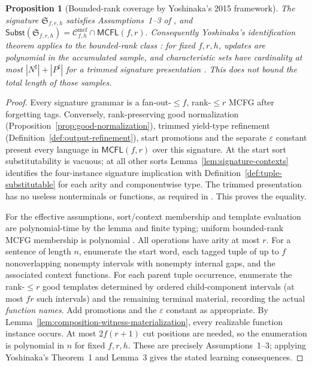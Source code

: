 \documentclass[11pt]{article}
\numberwithin{equation}{section}
\theoremstyle{plain}
\newtheorem{proposition}[theorem]{Proposition}
\theoremstyle{definition}
\theoremstyle{remark}
\newcommand{\Cmcf}[2]{\mathcal{C}^{\mathrm{mcf}}_{#1,#2}}
\newcommand{\eps}{\varepsilon}
\theoremstyle{plain}
\begin{document}
\begin{proposition}[Bounded-rank coverage by Yoshinaka's 2015 framework]
\label{prop:yoshinaka2015-embedding}
The signature $\mathfrak S_{f,r,h}$ satisfies
Assumptions~1--3 of
\cite{Yoshinaka2015General}, and
\(\mathsf{Subst}(\mathfrak S_{f,r,h}) =\Cmcf{f}{h}\cap\mathsf{MCFL}(f,r).\)
Consequently Yoshinaka's identification theorem
applies to the bounded-rank class
\cite[Theorem~1]{Yoshinaka2015General}:
for fixed $f,r,h$, updates are polynomial
in the accumulated sample, and characteristic
sets have cardinality at most
$|N^\sharp|+|P^\sharp|$ for a trimmed
signature presentation
\cite[Lemma~3]{Yoshinaka2015General}.
This does not bound the total \emph{length}
of those samples.
\end{proposition}

\begin{proof}
Every signature grammar is a fan-out-$\le f$,
rank-$\le r$ MCFG after forgetting tags.
Conversely, rank-preserving good normalization
(Proposition~\ref{prop:good-normalization}),
trimmed yield-type refinement
(Definition~\ref{def:output-refinement}),
start promotions and the separate $\eps$
constant present every language in
$\mathsf{MCFL}(f,r)$ over this signature.
At the start sort substitutability is
vacuous; at all other sorts
Lemma~\ref{lem:signature-contexts} identifies
the four-instance signature implication
with Definition~\ref{def:tuple-substitutable}
for each arity and componentwise type.
The trimmed presentation has no useless
nonterminals or functions, as required in
\cite[Section~6]{Yoshinaka2015General}.
This proves the equality.

For the effective assumptions, sort/context
membership and template evaluation are
polynomial-time by the lemma and finite
typing; uniform bounded-rank MCFG membership
is polynomial
\cite[Proposition~4]{Yoshinaka2011}.
All operations have arity at most $r$.
For a sentence of length $n$, enumerate
the start word, each tagged tuple of up
to $f$ nonoverlapping nonempty intervals
with nonempty internal gaps, and the
associated context functions. For each
parent tuple occurrence, enumerate the
rank-$\le r$ good templates determined by
ordered child-component intervals (at most
$fr$ such intervals) and the remaining
terminal material, recording the actual
\emph{function names}. Add promotions and
the $\eps$ constant as appropriate.
By Lemma~\ref{lem:composition-witness-materialization},
every realizable function instance occurs.
At most $2f(r+1)$ cut positions are needed,
so the enumeration is polynomial in $n$
for fixed $f,r,h$. These are precisely
Assumptions~1--3; applying Yoshinaka's
Theorem~1 and Lemma~3 gives the stated
learning consequences.
\end{proof}
\end{document}

